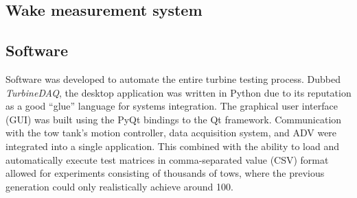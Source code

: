 \subsection{Wake measurement system}


\subsection{Software}

Software was developed to automate the entire turbine testing process. Dubbed
\textit{TurbineDAQ}, the desktop application was written in Python due to its
reputation as a good ``glue'' language for systems integration. The graphical
user interface (GUI) was built using the PyQt bindings to the Qt framework.
Communication with the tow tank's motion controller, data acquisition system,
and ADV were integrated into a single application. This combined with the
ability to load and automatically execute test matrices in comma-separated value
(CSV) format allowed for experiments consisting of thousands of tows, where the
previous generation could only realistically achieve around 100.